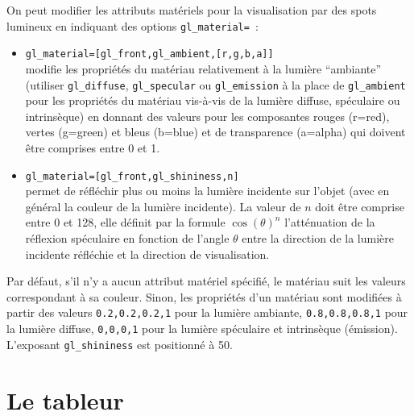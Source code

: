 \documentclass[a4paper,11pt]{article}
\begin{document}
On peut modifier les attributs mat\'eriels pour la visualisation par des
spots lumineux en indiquant des options \verb|gl_material=|~:
\begin{itemize}
\item \verb|gl_material=[gl_front,gl_ambient,[r,g,b,a]]|\\ 
modifie
les propri\'et\'es du mat\'eriau relativement \`a la lumi\`ere ``ambiante''
(utiliser \verb|gl_diffuse|, \verb|gl_specular| ou \verb|gl_emission|
\`a la place de \verb|gl_ambient| pour les propri\'et\'es du mat\'eriau vis-\`a-vis
de la lumi\`ere diffuse, sp\'eculaire ou intrins\`eque) en
donnant des valeurs pour les composantes rouges (r=red), vertes (g=green) et
bleus (b=blue) et de transparence (a=alpha) qui doivent \^etre comprises
entre 0 et 1. 
\item
\verb|gl_material=[gl_front,gl_shininess,n]|\\
permet de r\'efl\'echir plus ou moins la lumi\`ere
incidente sur l'objet (avec en g\'en\'eral la couleur de la lumi\`ere incidente).
La valeur de $n$ doit \^etre comprise entre 0 et 128, elle d\'efinit par
la formule $\cos(\theta)^n$ l'att\'enuation de la r\'eflexion sp\'eculaire
en fonction de l'angle $\theta$ entre la direction de 
la lumi\`ere incidente r\'efl\'echie
et la direction de visualisation.
\end{itemize}
Par d\'efaut, s'il n'y a aucun attribut mat\'eriel sp\'ecifi\'e, le mat\'eriau suit les
valeurs correspondant \`a sa couleur. Sinon, les propri\'et\'es d'un
mat\'eriau sont modifi\'ees \`a partir des valeurs
\verb|0.2,0.2,0.2,1| pour la lumi\`ere ambiante, 
\verb|0.8,0.8,0.8,1| pour la lumi\`ere diffuse,
\verb|0,0,0,1| pour la lumi\`ere sp\'eculaire et intrins\`eque (\'emission).
L'exposant \verb|gl_shininess| est positionn\'e \`a 50.


\section{Le tableur}
\end{document}
